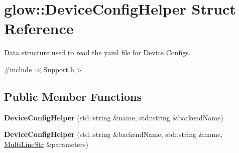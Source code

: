\hypertarget{structglow_1_1_device_config_helper}{}\section{glow\+:\+:Device\+Config\+Helper Struct Reference}
\label{structglow_1_1_device_config_helper}


Data structure used to read the yaml file for Device Configs.  




{\ttfamily \#include $<$Support.\+h$>$}

\subsection*{Public Member Functions}
\begin{DoxyCompactItemize}
\item 
\mbox{\label{structglow_1_1_device_config_helper_a5c145791b514572f8230fda22e2806e6}} 
{\bfseries Device\+Config\+Helper} (std\+::string \&name, std\+::string \&backend\+Name)
\item 
\mbox{\label{structglow_1_1_device_config_helper_a1681f3b52175972585c2ce6c2027c886}} 
{\bfseries Device\+Config\+Helper} (std\+::string \&backend\+Name, std\+::string \&name, \hyperlink{structglow_1_1_multi_line_str}{Multi\+Line\+Str} \&parameters)
\end{DoxyCompactItemize}
